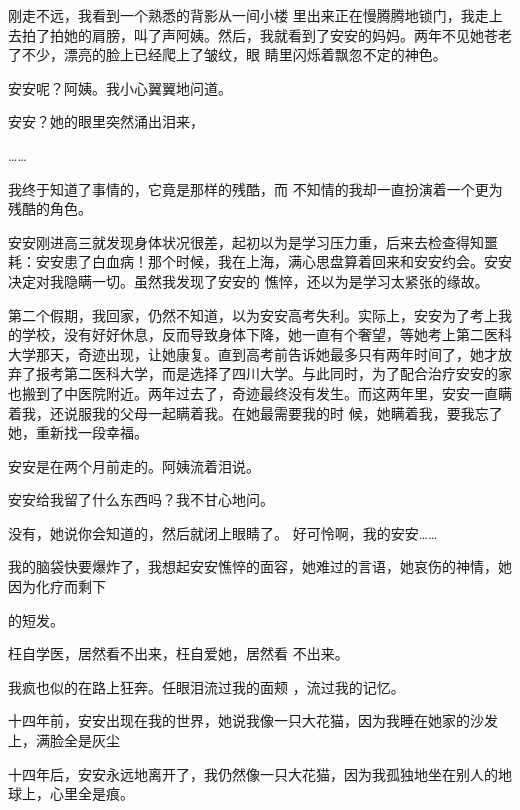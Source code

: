 \documentclass{article}
\begin{document}
刚走不远，我看到一个熟悉的背影从一间小楼
\newpage
里出来正在慢腾腾地锁门，我走上去拍了拍她的肩膀，叫了声阿姨。然后，我就看到了安安的妈妈。两年不见她苍老了不少，漂亮的脸上已经爬上了皱纹，眼
睛里闪烁着飘忽不定的神色。 


安安呢？阿姨。我小心翼翼地问道。 


安安？她的眼里突然涌出泪来， 


…… 


我终于知道了事情的，它竟是那样的残酷，而
不知情的我却一直扮演着一个更为残酷的角色。 

安安刚进高三就发现身体状况很差，起初以为是学习压力重，后来去检查得知噩耗：安安患了白血病！那个时候，我在上海，满心思盘算着回来和安安约会。安安决定对我隐瞒一切。虽然我发现了安安的
憔悴，还以为是学习太紧张的缘故。 

\newpage

第二个假期，我回家，仍然不知道，以为安安高考失利。实际上，安安为了考上我的学校，没有好好休息，反而导致身体下降，她一直有个奢望，等她考上第二医科大学那天，奇迹出现，让她康复。直到高考前告诉她最多只有两年时间了，她才放弃了报考第二医科大学，而是选择了四川大学。与此同时，为了配合治疗安安的家也搬到了中医院附近。两年过去了，奇迹最终没有发生。而这两年里，安安一直瞒着我，还说服我的父母一起瞒着我。在她最需要我的时
候，她瞒着我，要我忘了她，重新找一段幸福。  


安安是在两个月前走的。阿姨流着泪说。 


安安给我留了什么东西吗？我不甘心地问。 

没有，她说你会知道的，然后就闭上眼睛了。
好可怜啊，我的安安…… 

我的脑袋快要爆炸了，我想起安安憔悴的面容，她难过的言语，她哀伤的神情，她因为化疗而剩下

\newpage
的短发。 

枉自学医，居然看不出来，枉自爱她，居然看
不出来。 

我疯也似的在路上狂奔。任眼泪流过我的面颊
，流过我的记忆。 

十四年前，安安出现在我的世界，她说我像一只大花猫，因为我睡在她家的沙发上，满脸全是灰尘

十四年后，安安永远地离开了，我仍然像一只大花猫，因为我孤独地坐在别人的地球上，心里全是痕。
\end{document}
